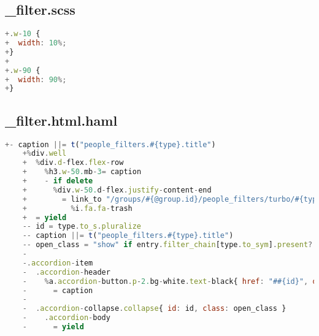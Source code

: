\subsection{\_filter.scss}
\begin{lstlisting}[language=JavaScript]
+.w-10 {
+  width: 10%;
+}
+
+.w-90 {
+  width: 90%;
+}
\end{lstlisting}

\newpage

\subsection{\_filter.html.haml}
\begin{lstlisting}[language=JavaScript]
    +- caption ||= t("people_filters.#{type}.title")
    +%div.well
    +  %div.d-flex.flex-row
    +    %h3.w-50.mb-3= caption
    +    - if delete
    +      %div.w-50.d-flex.justify-content-end
    +        = link_to "/groups/#{@group.id}/people_filters/turbo/#{type.to_s}", class: "button btn", data: {turbo_method: :delete} do
    +          %i.fa.fa-trash
    +  = yield
    -- id = type.to_s.pluralize
    -- caption ||= t("people_filters.#{type}.title")
    -- open_class = "show" if entry.filter_chain[type.to_sym].present?
    -
    -.accordion-item
    -  .accordion-header
    -    %a.accordion-button.p-2.bg-white.text-black{ href: "##{id}", data: { bs_toggle: :collapse } }
    -      = caption
    -
    -  .accordion-collapse.collapse{ id: id, class: open_class }
    -    .accordion-body
    -      = yield
\end{lstlisting}

\newpage

